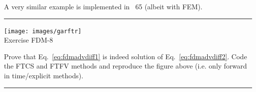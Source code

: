 A very similar example is implemented in \stone~65 (albeit with FEM).

\begin{center}
\begin{minipage}[t]{0.77\textwidth}
\par\noindent\rule{\textwidth}{0.4pt}

\begin{center}
\texttt{[image: images/garftr]} \\
{\color{orange}Exercise FDM-8}
\end{center}

Prove that Eq.~\eqref{eq:fdmadvdiff1} is indeed solution of 
Eq.~\eqref{eq:fdmadvdiff2}. Code the FTCS and FTFV methods and reproduce 
the figure above (i.e. only forward in time/explicit methods).

\par\noindent\rule{\textwidth}{0.4pt}
\end{minipage}
\end{center}

